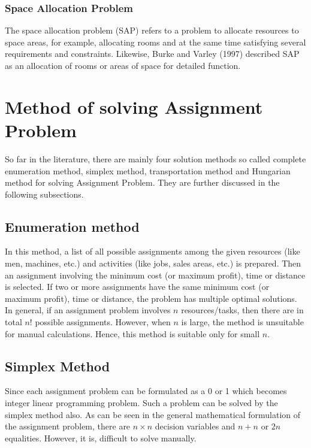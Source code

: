 \documentclass[11pt]{report}
\begin{document}
	\subsubsection{Space Allocation Problem}
	The space allocation problem (SAP) refers to a problem to allocate resources to space areas, for example, allocating rooms and at the same time satisfying several requirements and constraints. Likewise, Burke and Varley (1997) described SAP as an allocation of rooms or areas of space for detailed function.
	
	\section{Method of solving Assignment Problem}
	So far in the literature, there are mainly four solution methods so called complete enumeration method, simplex method, transportation method and Hungarian method for solving Assignment Problem. They are further discussed in the following subsections.
	
	\subsection{Enumeration method}
	In this method, a list of all possible assignments among the given resources (like men, machines, etc.) and activities (like jobs, sales areas, etc.) is prepared. Then an assignment involving the minimum cost (or maximum profit), time or distance is selected. If two or more assignments have
	the same minimum cost (or maximum profit), time or distance, the problem has multiple optimal solutions. In general, if an assignment problem involves $n$ resources/tasks, then there are in total $n!$ possible assignments. However, when $n$ is large, the method is unsuitable for manual calculations. Hence, this method is suitable only for small $n$.
	
	\subsection{Simplex Method}
	Since each assignment problem can be formulated as a 0 or 1 which becomes integer linear programming problem. Such a problem can be solved by the simplex method also. As can be seen in the general mathematical formulation of the assignment problem, there are $n\times n$ decision variables and $n+n$ or $2n$ equalities. However, it is, difficult to solve manually.
	
\end{document}
